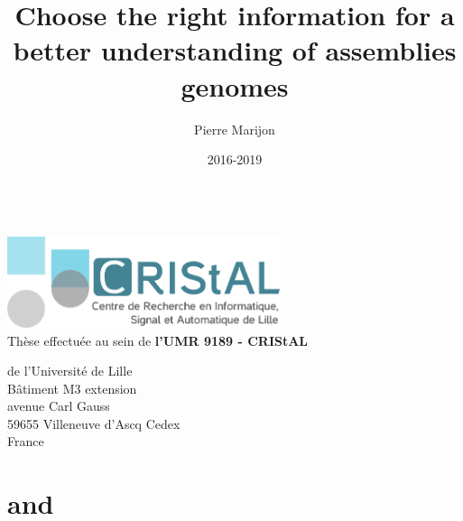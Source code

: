 \documentclass{thesis}
\title{Choose the right information for a better understanding of assemblies genomes} %
\author{Pierre Marijon}
\date{2016-2019}
\newcommand{\onlyinsubfile}[1]{#1}
\newcommand{\notinsubfile}[1]{}
\begin{document}
\renewcommand{\onlyinsubfile}[1]{}
\renewcommand{\notinsubfile}[1]{#1}

\maketitle
\clearpage

\listoftodos

\begin{center}
~\vspace*{\fill}\\
\thispagestyle{plain}
\includegraphics[width=0.6\textwidth]{assets/images/logo_cristal}\vspace{0.5cm}\\
Thèse effectuée au sein de \textbf{l'UMR 9189 - CRIStAL}\par 
 de l'Université de Lille\\
Bâtiment M3 extension\\
avenue Carl Gauss\\
59655 Villeneuve d'Ascq Cedex\\
France
\vspace*{\fill}
\clearpage
\end{center}

\frontmatter




\tableofcontents

\mainmatter












\appendix

\chapter{\knot}


\chapter{\yacrd and \fpa}


\notinsubfile{


}
\end{document}
